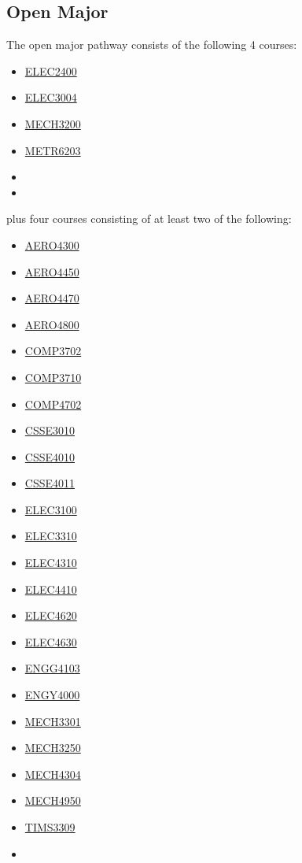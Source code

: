 \documentclass[a4paper,12pt]{report}
\begin{document}
\subsection{Open Major}
The open major pathway consists of the following 4 courses:
\begin{multicols}{3}
    \begin{itemize}
        \item \hyperlink{ELEC2400}{ELEC2400}
        \item \hyperlink{ELEC3004}{ELEC3004}
        \item \hyperlink{MECH3200}{MECH3200}
        \item \hyperlink{METR6203}{METR6203}
        \item[]
        \item[]
    \end{itemize}
\end{multicols}
plus four courses consisting of at least two of the following:
\begin{multicols}{3}
    \begin{itemize}
        \item \hyperlink{AERO4300}{AERO4300}
        \item \hyperlink{AERO4450}{AERO4450}
        \item \hyperlink{AERO4470}{AERO4470}
        \item \hyperlink{AERO4800}{AERO4800}
        \item \hyperlink{COMP3702}{COMP3702}
        \item \hyperlink{COMP3710}{COMP3710}
        \item \hyperlink{COMP4702}{COMP4702}
        \item \hyperlink{CSSE3010}{CSSE3010}
        \item \hyperlink{CSSE4010}{CSSE4010}
        \item \hyperlink{CSSE4011}{CSSE4011}
        \item \hyperlink{ELEC3100}{ELEC3100}
        \item \hyperlink{ELEC3310}{ELEC3310}
        \item \hyperlink{ELEC4310}{ELEC4310}
        \item \hyperlink{ELEC4410}{ELEC4410}
        \item \hyperlink{ELEC4620}{ELEC4620}
        \item \hyperlink{ELEC4630}{ELEC4630}
        \item \hyperlink{ENGG4103}{ENGG4103}
        \item \hyperlink{ENGY4000}{ENGY4000}
        \item \hyperlink{MECH3301}{MECH3301}
        \item \hyperlink{MECH3250}{MECH3250}
        \item \hyperlink{MECH4304}{MECH4304}
        \item \hyperlink{MECH4950}{MECH4950}
        \item \hyperlink{TIMS3309}{TIMS3309}
        \item[]
    \end{itemize}
\end{multicols}
\end{document}
